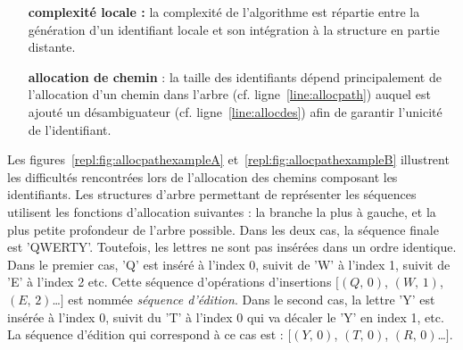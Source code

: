 \begin{itemize}
\item [\textbf{complexité locale :}] la complexité de l'algorithme est répartie
  entre la génération d'un identifiant locale et son intégration à la structure
  en partie distante.
\item [\textbf{allocation de chemin} :] la taille des identifiants dépend
  principalement de l'allocation d'un chemin dans l'arbre
  (cf. ligne~\ref{line:allocpath}) auquel est ajouté un désambiguateur
  (cf. ligne~\ref{line:allocdes}) afin de garantir l'unicité de l'identifiant.
\end{itemize}


Les figures~\ref{repl:fig:allocpathexampleA} et~\ref{repl:fig:allocpathexampleB}
illustrent les difficultés rencontrées lors de l'allocation des chemins
composant les identifiants. Les structures d'arbre permettant de représenter les
séquences utilisent les fonctions d'allocation suivantes : la branche la plus à
gauche, et la plus petite profondeur de l'arbre possible. Dans les deux cas, la
séquence finale est 'QWERTY'. Toutefois, les lettres ne sont pas insérées dans
un ordre identique. Dans le premier cas, 'Q' est inséré à l'index 0, suivit de
'W' à l'index 1, suivit de 'E' à l'index 2 etc. Cette séquence d'opérations
d'insertions $[(Q,\,0)$, $(W,\,1)$, $(E,\,2)$\ldots$]$ est nommée \emph{séquence
  d'édition}. Dans le second cas, la lettre 'Y' est insérée à l'index 0, suivit
du 'T' à l'index 0 qui va décaler le 'Y' en index 1, etc. La séquence d'édition
qui correspond à ce cas est : $[(Y,\,0)$, $(T,\,0)$, $(R,\,0)$\ldots$]$.

